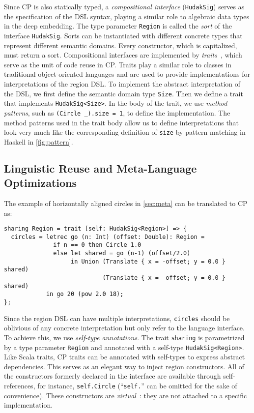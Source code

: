 \noindent
Since CP is also statically typed, a \emph{compositional interface}
(\lstinline{HudakSig}) serves as the specification of the DSL syntax, playing a
similar role to algebraic data types in the deep embedding. The type parameter
\lstinline{Region} is called the \emph{sort} of the interface
\lstinline{HudakSig}. Sorts can be instantiated with different concrete types
that represent different semantic domains. Every constructor, which is
capitalized, must return a sort. Compositional interfaces are implemented by
\emph{traits}~\citep{ducasse2006traits,bi2018typed}, which serve as the unit of
code reuse in CP. Traits play a similar role to classes in traditional
object-oriented languages and are used to provide implementations for
interpretations of the region DSL. To implement the abstract interpretation of
the DSL, we first define the semantic domain type \lstinline{Size}. Then we
define a trait that implements \lstinline{HudakSig<Size>}. In the body of the
trait, we use \emph{method patterns}, such as \lstinline{(Circle _).size = 1},
to define the implementation. The method patterns used in the trait body allow
us to define interpretations that look very much like the corresponding
definition of \lstinline{size} by pattern matching in Haskell in
\autoref{fig:pattern}.

\subsection{Linguistic Reuse and Meta-Language Optimizations} \label{sec:sharing}

The example of horizontally aligned circles in \autoref{sec:meta} can be
translated to CP as:

\begin{lstlisting}
sharing Region = trait [self: HudakSig<Region>] => {
  circles = letrec go (n: Int) (offset: Double): Region =
              if n == 0 then Circle 1.0
              else let shared = go (n-1) (offset/2.0)
                   in Union (Translate { x = -offset; y = 0.0 } shared)
                            (Translate { x =  offset; y = 0.0 } shared)
            in go 20 (pow 2.0 18);
};
\end{lstlisting}

\noindent
Since the region DSL can have multiple interpretations, \lstinline{circles}
should be oblivious of any concrete interpretation but only refer to the
language interface. To achieve this, we use \emph{self-type annotations}. The
trait \lstinline{sharing} is parametrized by a type parameter \lstinline{Region}
and annotated with a self-type \lstinline{HudakSig<Region>}. Like Scala traits,
CP traits can be annotated with self-types to express abstract dependencies.
This serves as an elegant way to inject region constructors. All of the
constructors formerly declared in the interface are available through
self-references, for instance, \lstinline{self.Circle} (``\lstinline{self.}''
can be omitted for the sake of convenience). These constructors are
\emph{virtual}~\citep{madsen1989virtual,ernst2006virtual}: they are not attached
to a specific implementation.

